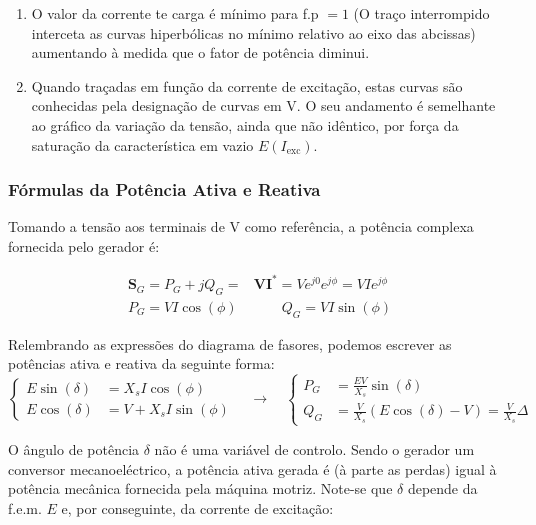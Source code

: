 \vspace{0.5em}
\begin{mdframed}
    \begin{enumerate}
        \item  O valor da corrente te carga é mínimo para f.p $= 1$ (O traço interrompido interceta as curvas hiperbólicas no mínimo relativo ao eixo das abcissas) aumentando à medida que o fator de potência diminui.

        \item Quando traçadas em função da corrente de excitação, estas curvas são conhecidas pela designação de curvas em V. O seu andamento é semelhante ao gráfico da variação da tensão, ainda que não idêntico, por força da saturação da característica em vazio $E(I_\text{exc})$.
    \end{enumerate}
\end{mdframed}

\subsubsection{Fórmulas da Potência Ativa e Reativa}

\noindent Tomando a tensão aos terminais de V como referência, a potência complexa fornecida pelo gerador é:

$$
\begin{aligned}
      \mathbf{S}_G = P_G + jQ_G = &\mathbf{V}\mathbf{I}^* = V e^{j 0} e^{j \phi} = VI e^{j \phi}\\
      P_G = V I \cos(\phi)&\qquad
      Q_G = V I \sin(\phi)
\end{aligned}
$$

\noindent Relembrando as expressões do diagrama de fasores, podemos escrever as potências ativa e reativa da seguinte forma:
$$
    \left\{\begin{aligned}
        E \sin(\delta) &= X_s I \cos(\phi)\\
        E \cos(\delta) &= V + X_s I \sin(\phi)
    \end{aligned}\right.\quad
    \rightarrow\quad
    \left\{\begin{aligned}
         P_G &= \frac{E V}{X_s} \sin(\delta)\\
         Q_G &= \frac{V}{X_s} \left(E\cos(\delta) - V\right) =  \frac{V}{X_s} \Delta
    \end{aligned}\right.\qquad
$$

\noindent O ângulo de potência $\delta$ não é uma variável de controlo. Sendo o gerador um conversor mecanoeléctrico, a potência ativa gerada é (à parte as perdas) igual à potência mecânica fornecida pela máquina motriz. Note-se que $\delta$ depende da f.e.m. $E$ e, por conseguinte, da corrente de excitação:

